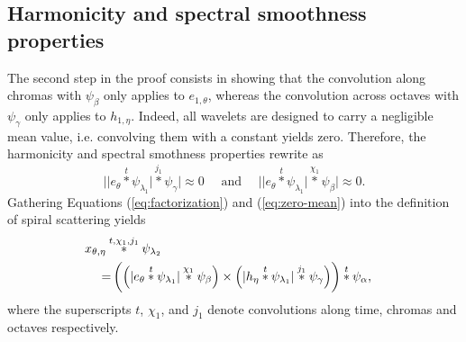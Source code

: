 \documentclass[twoside,a4paper]{article}
\begin{document}
\subsection{Harmonicity and spectral smoothness properties}

The second step in the proof consists in showing that the convolution along chromas with $\psi_\beta$ only applies to $e_{1,\theta}$, whereas the convolution across octaves with $\psi_\gamma$ only applies to $h_{1,\eta}$. Indeed, all wavelets are designed to carry a negligible mean value, i.e. convolving them with a constant yields zero. Therefore, the harmonicity and spectral smothness properties rewrite as
\begin{equation}
\Big\vert \vert e_\theta \overset{t}{\ast} \psi_{\lambda_1} \vert \overset{j_1}{\ast} \psi_{\gamma} \Big\vert \approx 0
\quad
\text{ and }
\quad
\Big\vert \vert e_\theta \overset{t}{\ast} \psi_{\lambda_1} \vert \overset{\chi_1}{\ast} \psi_{\beta} \Big \vert \approx 0.
\label{eq:zero-mean}
\end{equation}
Gathering Equations (\ref{eq:factorization}) and (\ref{eq:zero-mean}) into the definition of spiral scattering yields
\begin{eqnarray}
x_{\theta,\eta}\overset{t,\chi_{1},j_{1}}{\ast}\psi_{\lambda_{2}}  \mkern-72mu \\
 = & \left(\Big(\vert e_{\theta}\overset{t}{\ast}\psi_{\lambda_{1}}\vert\overset{\chi_{1}}{\ast}\psi_{\beta}\Big)\times \Big(\vert h_{\eta}\overset{t}{\ast}\psi_{\lambda_{1}}\vert\overset{j_{1}}{\ast}\psi_{\gamma}\Big)\right)\overset{t}{\ast}\psi_{\alpha} \nonumber,
\end{eqnarray}
where the superscripts $t$, $\chi_{1}$, and $j_{1}$ denote convolutions along time, chromas and octaves respectively.
\end{document}

